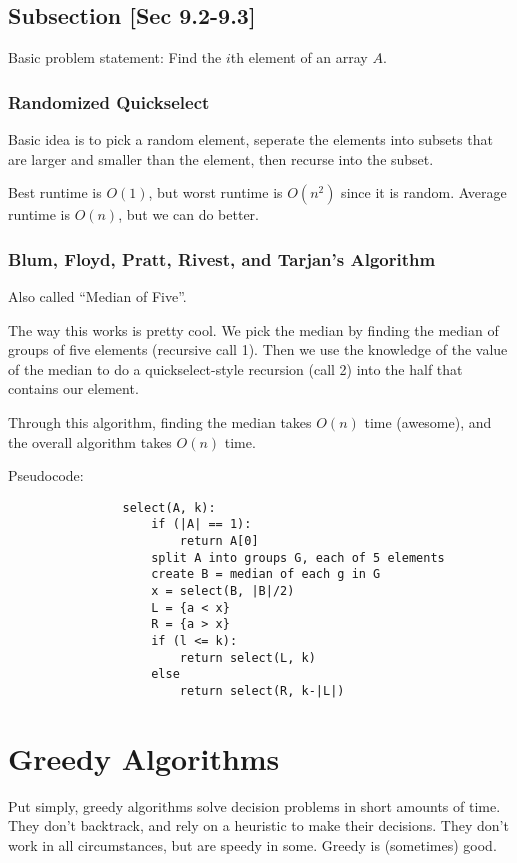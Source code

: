    \section{Subsection [Sec 9.2-9.3]}
        Basic problem statement: Find the $i$th element of an array $A$.
        \subsection{Randomized Quickselect}
            Basic idea is to pick a random element, seperate the elements
            into subsets that are larger and smaller than the element, then
            recurse into the subset.

            Best runtime is $O(1)$, but worst runtime is $O(n^2)$ since it is
            random. Average runtime is $O(n)$, but we can do better.

        \subsection{Blum, Floyd, Pratt, Rivest, and Tarjan's Algorithm}
            Also called ``Median of Five''.

            The way this works is pretty cool. We pick the median by finding
            the median of groups of five elements (recursive call 1). Then we
            use the knowledge of the value of the median to do a
            quickselect-style recursion (call 2) into the half that contains our
            element.

            Through this algorithm, finding the median takes $O(n)$ time
            (awesome), and the overall algorithm takes $O(n)$ time.

            Pseudocode:
            \begin{verbatim}
                select(A, k):
                    if (|A| == 1):
                        return A[0]
                    split A into groups G, each of 5 elements
                    create B = median of each g in G
                    x = select(B, |B|/2)
                    L = {a < x}
                    R = {a > x}
                    if (l <= k):
                        return select(L, k)
                    else
                        return select(R, k-|L|)
            \end{verbatim}

\chapter{Greedy Algorithms}
    Put simply, greedy algorithms solve decision problems in short amounts of
    time. They don't backtrack, and rely on a heuristic to make their decisions.
    They don't work in all circumstances, but are speedy in some. Greedy is
    (sometimes) good.

